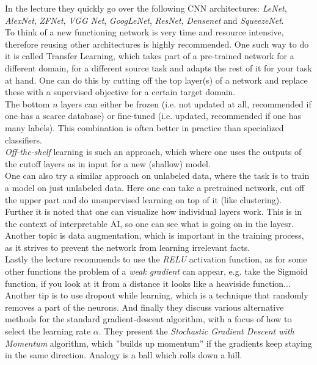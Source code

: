 \documentclass[12pt,a4paper]{article}
\begin{document}
\noindent In the lecture they quickly go over the following CNN architectures: \textit{LeNet}, \textit{AlexNet}, \textit{ZFNet}, \textit{VGG Net}, \textit{GoogLeNet}, \textit{ResNet}, \textit{Densenet} and \textit{SqueezeNet}.\\
To think of a new functioning network is very time and resource intensive, therefore reusing other architectures is highly recommended. One such way to do it is called Transfer Learning, which takes part of a pre-trained network for a different domain, for a different source task and adapts the rest of it for your task at hand. One can do this by cutting off the top layer(s) of a network and replace these with a supervised objective for a certain target domain.\\
The bottom \(n\) layers can either be frozen (i.e. not updated at all, recommended if one has a scarce database) or fine-tuned (i.e. updated, recommended if one has many labels). This combination is often better in practice than specialized classifiers.\\
\textit{Off-the-shelf} learning is such an approach, which where one uses the outputs of the cutoff layers as in input for a new (shallow) model.\\
One can also try a similar approach on unlabeled data, where the task is to train a model on just unlabeled data. Here one can take a pretrained network, cut off the upper part and do unsupervised learning on top of it (like clustering).\\[1em]
Further it is noted that one can visualize how individual layers work. This is in the context of interpretable AI, so one can see what is going on in the layesr. Another topic is data augmentation, which is important in the training process, as it strives to prevent the network from learning irrelevant facts.\\
Lastly the lecture recommends to use the \textit{RELU} activation function, as for some other functions the problem of a \textit{weak gradient} can appear, e.g. take the Sigmoid function, if you look at it from a distance it looks like a heaviside function...\\
Another tip is to use dropout while learning, which is a technique that randomly removes a part of the neurons. And finally they discuss various alternative methods for the standard gradient-descent algorithm, with a focus of how to select the learning rate \(\alpha\). They present the \textit{Stochastic Gradient Descent with Momentum} algorithm, which ''builds up momentum'' if the gradients keep staying in the same direction. Analogy is a ball which rolls down a hill.\\[1em]
\end{document}

